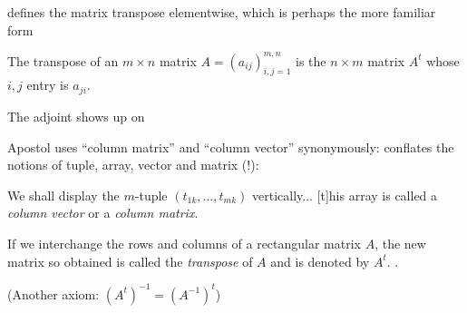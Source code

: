 \cite[p. 91]{Apostol1969} defines the matrix transpose elementwise, which is perhaps the more familiar form

The transpose of an $m \times n$ matrix $A = \left( a_{ij} \right)^{m,n}_{i,j=1}$ is the $n \times m$ matrix $A^t$ whose $i, j$ entry is $a_{ji}$.

The adjoint shows up on \cite[p. 122]{Apostol1969}

Apostol uses ``column matrix'' and ``column vector'' synonymously: \cite[p. 592]{Apostol1967} conflates the notions of tuple, array, vector and matrix (!):

We shall display the $m$-tuple $(t_{1k}, \dots, t_{mk})$ vertically... [t]his array is called a \textit{column vector} or a \textit{column matrix}.

If we interchange the rows and columns of a rectangular matrix $A$, the new matrix so obtained is called the \textit{transpose} of $A$ and is denoted by $A^t$. \cite[p. 615, Exercise 7]{Apostol1967}.

(Another axiom: $(A^t)^{-1} = (A^{-1})^t$)